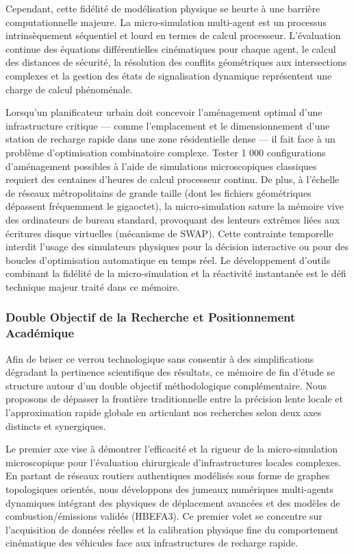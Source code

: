 \documentclass[11pt, a4paper]{article}
\begin{document}
Cependant, cette fidélité de modélisation physique se heurte à une
barrière computationnelle majeure. La micro-simulation multi-agent est
un processus intrinsèquement séquentiel et lourd en termes de calcul
processeur. L'évaluation continue des équations différentielles
cinématiques pour chaque agent, le calcul des distances de sécurité, la
résolution des conflits géométriques aux intersections complexes et la
gestion des états de signalisation dynamique représentent une charge de
calcul phénoménale.

Lorsqu'un planificateur urbain doit concevoir l'aménagement optimal
d'une infrastructure critique --- comme l'emplacement et le
dimensionnement d'une station de recharge rapide dans une zone
résidentielle dense --- il fait face à un problème d'optimisation
combinatoire complexe. Tester 1 000 configurations d'aménagement
possibles à l'aide de simulations microscopiques classiques requiert des
centaines d'heures de calcul processeur continu. De plus, à l'échelle de
réseaux métropolitains de grande taille (dont les fichiers géométriques
dépassent fréquemment le gigaoctet), la micro-simulation sature la
mémoire vive des ordinateurs de bureau standard, provoquant des lenteurs
extrêmes liées aux écritures disque virtuelles (mécanisme de SWAP).
Cette contrainte temporelle interdit l'usage des simulateurs physiques
pour la décision interactive ou pour des boucles d'optimisation
automatique en temps réel. Le développement d'outils combinant la
fidélité de la micro-simulation et la réactivité instantanée est le défi
technique majeur traité dans ce mémoire.

\subsubsection{Double Objectif de la Recherche et Positionnement
Académique}\label{double-objectif-de-la-recherche-et-positionnement-acaduxe9mique}

Afin de briser ce verrou technologique sans consentir à des
simplifications dégradant la pertinence scientifique des résultats, ce
mémoire de fin d'étude se structure autour d'un double objectif
méthodologique complémentaire. Nous proposons de dépasser la frontière
traditionnelle entre la précision lente locale et l'approximation rapide
globale en articulant nos recherches selon deux axes distincts et
synergiques.

Le premier axe vise à démontrer l'efficacité et la rigueur de la
micro-simulation microscopique pour l'évaluation chirurgicale
d'infrastructures locales complexes. En partant de réseaux routiers
authentiques modélisés sous forme de graphes topologiques orientés, nous
développons des jumeaux numériques multi-agents dynamiques intégrant des
physiques de déplacement avancées et des modèles de combustion/émissions
validés (HBEFA3). Ce premier volet se concentre sur l'acquisition de
données réelles et la calibration physique fine du comportement
cinématique des véhicules face aux infrastructures de recharge rapide.
\end{document}
